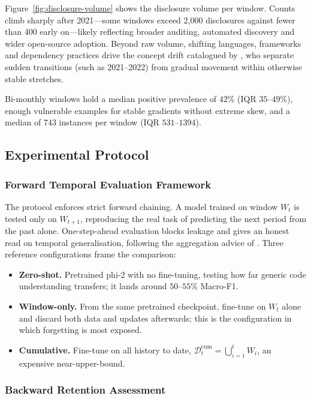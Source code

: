 \documentclass[a4paper,twoside]{article}
\begin{document}
Figure~\ref{fig:disclosure-volume} shows the disclosure volume per window. Counts climb sharply after 2021---some windows exceed 2{,}000 disclosures against fewer than 400 early on---likely reflecting broader auditing, automated discovery and wider open-source adoption. Beyond raw volume, shifting languages, frameworks and dependency practices drive the concept drift catalogued by \citet{Hinder2024ConceptDrift}, who separate sudden transitions (such as 2021--2022) from gradual movement within otherwise stable stretches.

Bi-monthly windows hold a median positive prevalence of $42\%$ (IQR $35$--$49\%$), enough vulnerable examples for stable gradients without extreme skew, and a median of 743 instances per window (IQR $531$--$1394$).

\subsection{Experimental Protocol}
\label{sec:protocol}

\subsubsection{Forward Temporal Evaluation Framework}
\label{sec:forward-eval}

\noindent
The protocol enforces strict forward chaining. A model trained on window $W_t$ is tested only on $W_{t+1}$, reproducing the real task of predicting the next period from the past alone. One-step-ahead evaluation blocks leakage and gives an honest read on temporal generalisation, following the aggregation advice of \citet{Lyu2022Splitting}. Three reference configurations frame the comparison:

\begin{itemize}
    \item \textbf{Zero-shot.} Pretrained phi-2 with no fine-tuning, testing how far generic code understanding transfers; it lands around $50$--$55\%$ Macro-F1.
    \item \textbf{Window-only.} From the same pretrained checkpoint, fine-tune on $W_t$ alone and discard both data and updates afterwards; this is the configuration in which forgetting is most exposed.
    \item \textbf{Cumulative.} Fine-tune on all history to date, $\mathcal{D}^{\text{cum}}_t = \bigcup_{i=1}^{t} W_i$, an expensive near-upper-bound.
\end{itemize}

\subsubsection{Backward Retention Assessment}
\label{sec:backward-eval}
\end{document}
